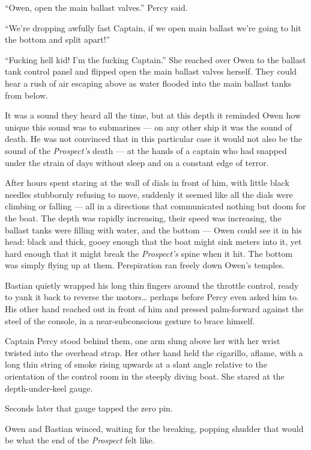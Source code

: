 \documentclass[
]{scrbook}
\begin{document}
``Owen, open the main ballast valves.'' Percy said.

``We're dropping awfully fast Captain, if we open main ballast we're
going to hit the bottom and split apart!''

``Fucking hell kid! I'm the fucking Captain.'' She reached over Owen to
the ballast tank control panel and flipped open the main ballast valves
herself. They could hear a rush of air escaping above as water flooded
into the main ballast tanks from below.

It was a sound they heard all the time, but at this depth it reminded
Owen how unique this sound was to submarines --- on any other ship it
was the sound of death. He was not convinced that in this particular
case it would not also be the sound of the \emph{Prospect's} death ---
at the hands of a captain who had snapped under the strain of days
without sleep and on a constant edge of terror.

After hours spent staring at the wall of dials in front of him, with
little black needles stubbornly refusing to move, suddenly it seemed
like all the dials were climbing or falling --- all in a directions that
communicated nothing but doom for the boat. The depth was rapidly
increasing, their speed was increasing, the ballast tanks were filling
with water, and the bottom --- Owen could see it in his head: black and
thick, gooey enough that the boat might sink meters into it, yet hard
enough that it might break the \emph{Prospect's} spine when it hit. The
bottom was simply flying up at them. Perspiration ran freely down Owen's
temples.

Bastian quietly wrapped his long thin fingers around the throttle
control, ready to yank it back to reverse the motors\ldots{} perhaps
before Percy even asked him to. His other hand reached out in front of
him and pressed palm-forward against the steel of the console, in a
near-subconscious gesture to brace himself.

Captain Percy stood behind them, one arm slung above her with her wrist
twisted into the overhead strap. Her other hand held the cigarillo,
aflame, with a long thin string of smoke rising upwards at a slant angle
relative to the orientation of the control room in the steeply diving
boat. She stared at the depth-under-keel gauge.

Seconds later that gauge tapped the zero pin.

Owen and Bastian winced, waiting for the breaking, popping shudder that
would be what the end of the \emph{Prospect} felt like.
\end{document}
